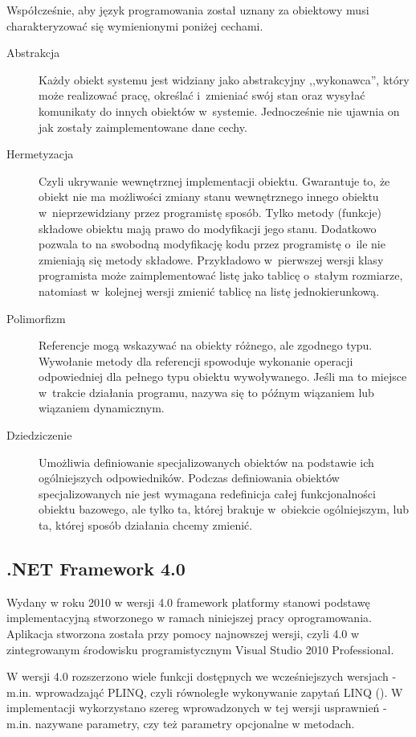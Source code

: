Współcześnie, aby język programowania został uznany za obiektowy musi charakteryzować się wymienionymi poniżej cechami.
\begin{description}
	\item[Abstrakcja] Każdy obiekt systemu jest widziany jako abstrakcyjny ,,wykonawca'', który może realizować pracę, określać i~zmieniać swój stan oraz wysyłać komunikaty do innych obiektów w~systemie. Jednocześnie nie ujawnia on jak zostały zaimplementowane dane cechy.
	\item[Hermetyzacja] Czyli ukrywanie wewnętrznej implementacji obiektu. Gwarantuje to, że obiekt nie ma możliwości zmiany stanu wewnętrznego innego obiektu w~nieprzewidziany przez programistę sposób. Tylko metody (funkcje) składowe obiektu mają prawo do modyfikacji jego stanu. Dodatkowo pozwala to na swobodną modyfikację kodu przez programistę o~ile nie zmieniają się metody składowe. Przykładowo w~pierwszej wersji klasy programista może zaimplementować listę jako tablicę o~stałym rozmiarze, natomiast w~kolejnej wersji zmienić tablicę na listę jednokierunkową.
	\item[Polimorfizm] Referencje mogą wskazywać na obiekty różnego, ale zgodnego typu. Wywołanie metody dla referencji spowoduje wykonanie operacji odpowiedniej dla pełnego typu obiektu wywoływanego. Jeśli ma to miejsce w~trakcie działania programu, nazywa się to późnym wiązaniem lub wiązaniem dynamicznym.
	\item[Dziedziczenie] Umożliwia definiowanie specjalizowanych obiektów na podstawie ich ogólniejszych odpowiedników. Podczas definiowania obiektów specjalizowanych nie jest wymagana redefinicja całej funkcjonalności obiektu bazowego, ale tylko ta, której brakuje w~obiekcie ogólniejszym, lub ta, której sposób działania chcemy zmienić.
	
\end{description}

\subsection{.NET Framework 4.0}
Wydany w roku 2010 w wersji 4.0 framework platformy stanowi podstawę implementacyjną stworzonego w ramach niniejszej pracy oprogramowania. Aplikacja stworzona została przy pomocy najnowszej wersji, czyli 4.0 w zintegrowanym środowisku programistycznym Visual Studio 2010 Professional. 

W wersji 4.0 rozszerzono wiele funkcji dostępnych we wcześniejszych wersjach - m.in. wprowadzająć PLINQ, czyli równoległe wykonywanie zapytań LINQ (). W implementacji wykorzystano szereg wprowadzonych w tej wersji usprawnień - m.in. nazywane parametry, czy też parametry opcjonalne w metodach. 


